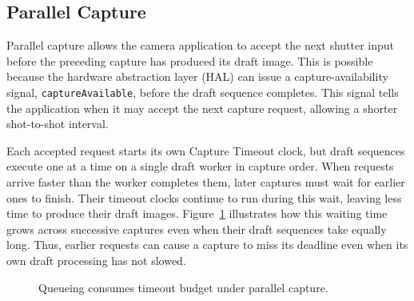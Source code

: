 \subsection{Parallel Capture}
\label{sec:parallel-capture}

Parallel capture allows the camera application to accept the next shutter input before the preceding capture has produced its draft image.
This is possible because the hardware abstraction layer (HAL) can issue a capture-availability signal, \texttt{captureAvailable}, before the draft sequence completes.
This signal tells the application when it may accept the next capture request, allowing a shorter shot-to-shot interval.

Each accepted request starts its own Capture Timeout clock, but draft sequences execute one at a time on a single draft worker in capture order.
When requests arrive faster than the worker completes them, later captures must wait for earlier ones to finish.
Their timeout clocks continue to run during this wait, leaving less time to produce their draft images.
Figure~\ref{fig:overlap} illustrates how this waiting time grows across successive captures even when their draft sequences take equally long.
Thus, earlier requests can cause a capture to miss its deadline even when its own draft processing has not slowed.

\begin{figure}[t]
  \centering
  \resizebox{\columnwidth}{!}{}
  \caption{Queueing consumes timeout budget under parallel capture.}
  \label{fig:overlap}
\end{figure}
